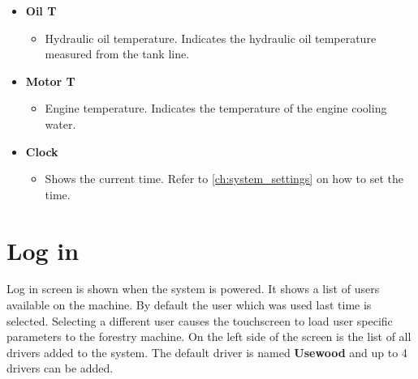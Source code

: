 \documentclass[12pt,a4paper,english]{uvmanual}
\begin{document}
\begin{itemize}
 \item \textbf{Oil T}
 \begin{itemize}
  \item Hydraulic oil temperature. Indicates the hydraulic oil temperature measured from the tank line. 
 \end{itemize}
 
 \item \textbf{Motor T}
 \begin{itemize}
  \item Engine temperature. Indicates the temperature of the engine cooling water.
 \end{itemize}
 
 \item \textbf{Clock}
 \begin{itemize}
  \item Shows the current time. Refer to \autoref{ch:system_settings} on how to set the time.
 \end{itemize}

\end{itemize}


\chapter{Log in}\label{ch:login}

Log in screen is shown when the system is powered. It shows a list of users available on the machine. By default the user which was used last time is selected. Selecting a different user causes the touchscreen to load user specific parameters to the forestry machine. On the left side of the screen is the list of all drivers added to the system. The default driver is named \textbf{Usewood} and up to 4 drivers can be added.

\end{document}
